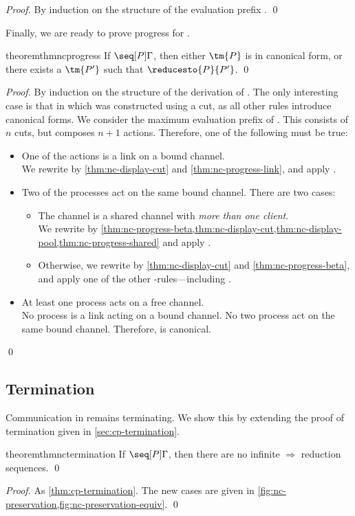 \documentclass[UKenglish]{llncs}
\begin{document}
\begin{proof}
  By induction on the structure of the evaluation prefix .
  \qed
\end{proof}
Finally, we are ready to prove progress for \nodcap.
\begin{restatable}[Progress]{theorem}{thmncprogress}\label{thm:nc-progress}
  If $\seq[{ P }]{ \Gamma }$, then either $\tm{P}$ is in canonical form, or
  there exists a $\tm{P'}$ such that $\reducesto{P}{P'}$. 
  \qed
\end{restatable}
\begin{proof}
  By induction on the structure of the derivation of \seq[P]{\Gamma}.
  The only interesting case is that in which  was constructed using a cut,
  as all other rules introduce canonical forms.
  We consider the maximum evaluation prefix  of . This consists of
  $n$ cuts, but composes $n+1$ actions. Therefore, one of the following must be
  true:
  \begin{itemize}
  \item
    One of the actions is a link on a bound channel.\\
    We rewrite by \cref{thm:nc-display-cut} and \cref{thm:nc-progress-link},
    and apply .
  \item
    Two of the processes act on the same bound channel. There are two cases:
    \begin{itemize}
    \item
      The channel is a shared channel with \emph{more than one client}.\\
      We rewrite by \cref{thm:nc-progress-beta,thm:nc-display-cut,thm:nc-display-pool,thm:nc-progress-shared} and apply .
    \item
      Otherwise, we rewrite by \cref{thm:nc-display-cut} and
      \cref{thm:nc-progress-beta}, and apply one of the other
      \textbeta-rules---including .
    \end{itemize}
  \item
    At least one process acts on a free channel.\\
    No process is a link acting on a bound channel. No two process act on the
    same bound channel. Therefore,  is canonical.
  \end{itemize}
  \qed
\end{proof}

\subsection{Termination}
\label{sec:nc-termination}
Communication in \nodcap remains terminating. We show this by extending the
proof of termination given in \cref{sec:cp-termination}.
\begin{restatable}[Termination]{theorem}{thmnctermination}\label{thm:nc-termination}
  If $\seq[{ P }]{ \Gamma }$, then there are no infinite $\Longrightarrow$
  reduction sequences.
  \qed
\end{restatable}
\begin{proof}
  As \cref{thm:cp-termination}. The new cases are given in
  \cref{fig:nc-preservation,fig:nc-preservation-equiv}. 
  \qed
\end{proof}
\end{document}
